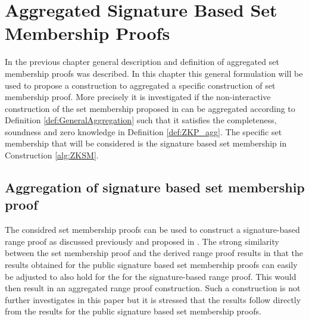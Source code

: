 \chapter{Aggregated Signature Based Set Membership Proofs}
\label{ch:AggSM}
\label{sec:ConstructAggregation}
In the previous chapter  general description and definition of aggregated set membership proofs was described. In this chapter this general formulation will be used to propose a construction to aggregated a specific construction of set membership proof. More precisely it is investigated if the non-interactive construction of the set membership proposed in \cite{Efficient_proof_interval} can be aggregated according to Definition \ref{def:GeneralAggregation} such that it satisfies the completeness, soundness and zero knowledge in Definition \ref{def:ZKP_agg}. The specific set membership that will be considered is the signature based set membership in Construction \ref{alg:ZKSM}.


\section{Aggregation of signature based set membership proof}


The considred set membership proofs can be used to construct a signature-based range proof as discussed previously and proposed in \cite{Efficient_proof_interval}. The strong similarity between the set membership proof and the derived range proof results in that the results obtained for the public signature based set membership proofs can easily be adjusted to also hold for the  for the signature-based range proof. This would then result in an aggregated range proof construction. Such a construction is not further investigates in this paper but it is stressed that the results follow directly from the results for the public signature based set membership proofs. 

